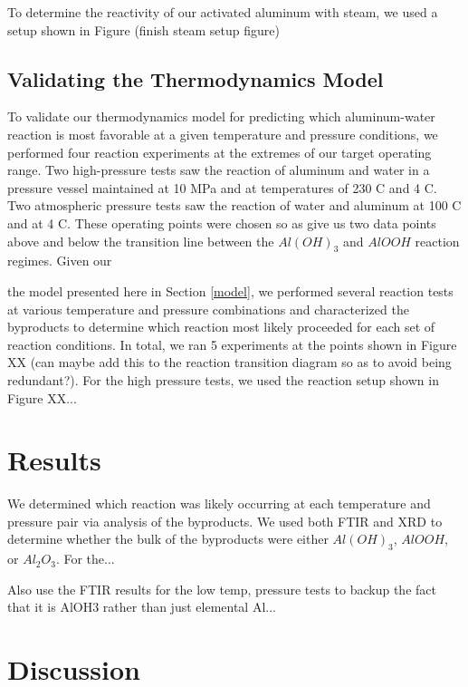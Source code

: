 \documentclass[preprint,12pt,3p]{elsarticle}
\begin{document}
To determine the reactivity of our activated aluminum with steam, we used a
setup shown in Figure (finish steam setup figure)

\subsection{Validating the Thermodynamics Model}

To validate our thermodynamics model for predicting which aluminum-water
reaction is most favorable at a given temperature and pressure conditions, we
performed four reaction experiments at the extremes of our target operating
range. Two high-pressure tests saw the reaction of aluminum and water in a
pressure vessel maintained at 10 MPa and at temperatures of 230 \textdegree C
and 4 \textdegree C. Two atmospheric pressure tests saw the reaction of water
and aluminum at 100 \textdegree C and at 4 \textdegree C. These operating points
were chosen so as give us two data points above and below the transition line
between the $Al(OH)_3$ and $AlOOH$ reaction regimes. Given our 

the model presented here in Section \ref{model}, we performed
several reaction tests at various temperature and pressure combinations and
characterized the byproducts to determine which reaction most likely proceeded
for each set of reaction conditions. In total, we ran 5 experiments at the
points shown in Figure XX (can maybe add this to the reaction transition diagram
so as to avoid being redundant?). For the high pressure tests, we used the
reaction setup shown in Figure XX...


\section{Results}
\label{results}

We determined which reaction was likely occurring at each temperature and
pressure pair via analysis of the byproducts. We used both FTIR and XRD to
determine whether the bulk of the byproducts were either $Al(OH)_3$, $AlOOH$, or
$Al_2O_3$. For the...

Also use the FTIR results for the low temp, pressure tests to backup the fact
that it is AlOH3 rather than just elemental Al...

\section{Discussion}
\label{discussion}
\end{document}
